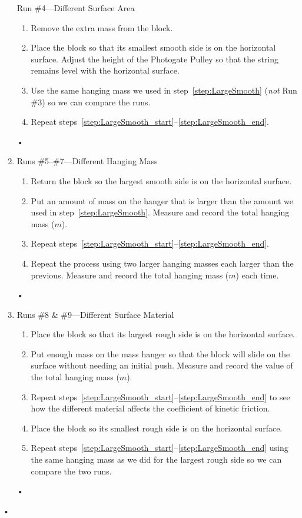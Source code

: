 \documentclass[main.tex]{subfiles}
\begin{document}
\begin{enumerate}
Run \#4---Different Surface Area
\begin{enumerate}
\item
Remove the extra mass from the block.
\item
Place the block so that its smallest smooth side is on the horizontal surface. Adjust the height of the Photogate Pulley so that the string remains level with the horizontal surface.
\item
Use the same hanging mass we used in step~\ref{step:LargeSmooth} (\emph{not} Run \#3) so we can compare the runs.
\item
Repeat steps~\ref{step:LargeSmooth_start}--\ref{step:LargeSmooth_end}.
\end{enumerate}•
\item
Runs \#5--\#7---Different Hanging Mass
\begin{enumerate}
\item
Return the block so the largest smooth side is on the horizontal surface.
\item
Put an amount of mass on the hanger that is larger than the amount we used in step~\ref{step:LargeSmooth}. Measure and record the total hanging mass ($m$).
\item
Repeat steps~\ref{step:LargeSmooth_start}--\ref{step:LargeSmooth_end}.
\item
Repeat the process using two larger hanging masses each larger than the previous. Measure and record the total hanging mass ($m$) each time.
\end{enumerate}•
\item
Runs \#8 \& \#9---Different Surface Material 
\begin{enumerate}
\item
Place the block so that its largest rough side is on the horizontal surface.
\item
Put enough mass on the mass hanger so that the block will slide on the surface without needing an initial push. Measure and record the value of the total hanging mass ($m$).
\item
Repeat steps~\ref{step:LargeSmooth_start}--\ref{step:LargeSmooth_end} to see how the different material affects the coefficient of kinetic friction.
\item
Place the block so its smallest rough side is on the horizontal surface.
\item
Repeat steps~\ref{step:LargeSmooth_start}--\ref{step:LargeSmooth_end} using the same hanging mass as we did for the largest rough side so we can compare the two runs.
\end{enumerate}•
\end{enumerate}•
\end{document}
